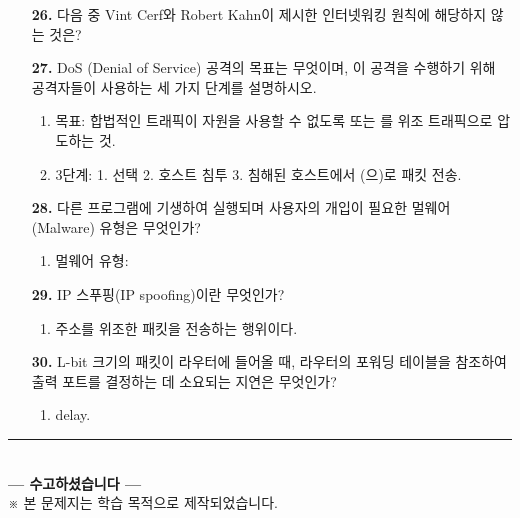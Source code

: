 \documentclass[a4paper, 10pt]{article}
\newcommand{\ansline}[1]{\underline{\hspace{#1}}}
\newcommand{\sectionbox}[1]{
  \vspace{0.5em}
  \noindent\fbox{\textbf{#1}}
  \vspace{0.5em}
}
\begin{document}
\begin{enumerate}[itemsep=2em, leftmargin=2em, label={}]
\item[] \sectionbox{VI. 보안 및 기타 (5문제)}

\item[\textbf{26.}] 다음 중 Vint Cerf와 Robert Kahn이 제시한 인터넷워킹 원칙에 해당하지 않는 것은?

\item[\textbf{27.}] DoS (Denial of Service) 공격의 목표는 무엇이며, 이 공격을 수행하기 위해 공격자들이 사용하는 세 가지 단계를 설명하시오.
\begin{enumerate}[label=\alph*., itemsep=0.3em, leftmargin=1.5em]
    \item 목표: 합법적인 트래픽이 자원을 사용할 수 없도록 \ansline{2.5cm} 또는 \ansline{2.5cm}를 위조 트래픽으로 압도하는 것.
    \item 3단계: 1. \ansline{2cm} 선택 2. 호스트 침투 3. 침해된 호스트에서 \ansline{2cm}(으)로 패킷 전송.
\end{enumerate}

\item[\textbf{28.}] 다른 프로그램에 기생하여 실행되며 사용자의 개입이 필요한 멀웨어(Malware) 유형은 무엇인가?
\begin{enumerate}[label=\alph*., itemsep=0.3em, leftmargin=1.5em]
    \item 멀웨어 유형: \ansline{4cm}
\end{enumerate}

\item[\textbf{29.}] IP 스푸핑(IP spoofing)이란 무엇인가?
\begin{enumerate}[label=\alph*., itemsep=0.3em, leftmargin=1.5em]
    \item \ansline{4cm} 주소를 위조한 패킷을 전송하는 행위이다.
\end{enumerate}

\item[\textbf{30.}] L-bit 크기의 패킷이 라우터에 들어올 때, 라우터의 포워딩 테이블을 참조하여 출력 포트를 결정하는 데 소요되는 지연은 무엇인가?
\begin{enumerate}[label=\alph*., itemsep=0.3em, leftmargin=1.5em]
    \item \ansline{5cm} delay.
\end{enumerate}

\end{enumerate}

\vfill
\begin{center}
  \rule{0.9\textwidth}{0.4pt}\\[8pt]
  {\small\textbf{--- 수고하셨습니다 ---}}\\[6pt]
  {\scriptsize ※ 본 문제지는 학습 목적으로 제작되었습니다.}
\end{center}
\end{document}
